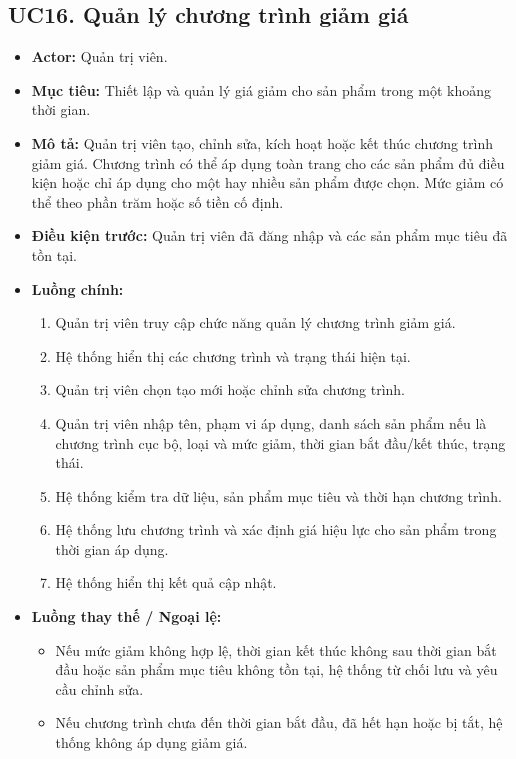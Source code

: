\documentclass[12pt,a4paper]{article}
\begin{document}

\subsection{UC16. Quản lý chương trình giảm giá}

\begin{itemize}
 \item \textbf{Actor:} Quản trị viên.
 \item \textbf{Mục tiêu:} Thiết lập và quản lý giá giảm cho sản phẩm trong một khoảng thời gian.
 \item \textbf{Mô tả:} Quản trị viên tạo, chỉnh sửa, kích hoạt hoặc kết thúc chương trình giảm giá. Chương trình có thể áp dụng toàn trang cho các sản phẩm đủ điều kiện hoặc chỉ áp dụng cho một hay nhiều sản phẩm được chọn. Mức giảm có thể theo phần trăm hoặc số tiền cố định.
 \item \textbf{Điều kiện trước:} Quản trị viên đã đăng nhập và các sản phẩm mục tiêu đã tồn tại.
 \item \textbf{Luồng chính:}
 \begin{enumerate}
  \item Quản trị viên truy cập chức năng quản lý chương trình giảm giá.
  \item Hệ thống hiển thị các chương trình và trạng thái hiện tại.
  \item Quản trị viên chọn tạo mới hoặc chỉnh sửa chương trình.
  \item Quản trị viên nhập tên, phạm vi áp dụng, danh sách sản phẩm nếu là chương trình cục bộ, loại và mức giảm, thời gian bắt đầu/kết thúc, trạng thái.
  \item Hệ thống kiểm tra dữ liệu, sản phẩm mục tiêu và thời hạn chương trình.
  \item Hệ thống lưu chương trình và xác định giá hiệu lực cho sản phẩm trong thời gian áp dụng.
  \item Hệ thống hiển thị kết quả cập nhật.
 \end{enumerate}
 \item \textbf{Luồng thay thế / Ngoại lệ:}
 \begin{itemize}
  \item Nếu mức giảm không hợp lệ, thời gian kết thúc không sau thời gian bắt đầu hoặc sản phẩm mục tiêu không tồn tại, hệ thống từ chối lưu và yêu cầu chỉnh sửa.
  \item Nếu chương trình chưa đến thời gian bắt đầu, đã hết hạn hoặc bị tắt, hệ thống không áp dụng giảm giá.

\end{itemize}
\end{itemize}
\end{document}
